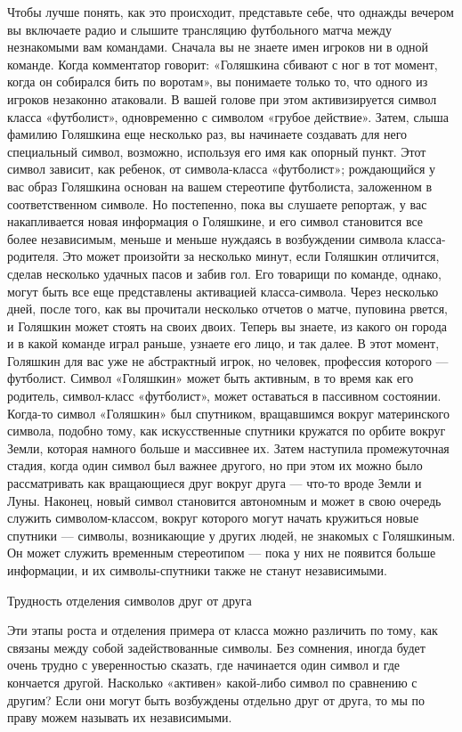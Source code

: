 \documentclass[../main.tex]{subfiles}
\begin{document}
Чтобы лучше понять, как это происходит, представьте себе, что однажды вечером вы включаете радио и слышите трансляцию футбольного матча между незнакомыми вам командами. Сначала вы не знаете имен игроков ни в одной команде. Когда комментатор говорит: «Голяшкина сбивают с ног в тот момент, когда он собирался бить по воротам», вы понимаете только то, что одного из игроков незаконно атаковали. В вашей голове при этом активизируется символ класса «футболист», одновременно с символом «грубое действие». Затем, слыша фамилию Голяшкина еще несколько раз, вы начинаете создавать для него специальный символ, возможно, используя его имя как опорный пункт. Этот символ зависит, как ребенок, от символа-класса «футболист»; рождающийся у вас образ Голяшкина основан на вашем стереотипе футболиста, заложенном в соответственном символе. Но постепенно, пока вы слушаете репортаж, у вас накапливается новая информация о Голяшкине, и его символ становится все более независимым, меньше и меньше нуждаясь в возбуждении символа класса-родителя. Это может произойти за несколько минут, если Голяшкин отличится, сделав несколько удачных пасов и забив гол. Его товарищи по команде, однако, могут быть все еще представлены активацией класса-символа. Через несколько дней, после того, как вы прочитали несколько отчетов о матче, пуповина рвется, и Голяшкин может стоять на своих двоих. Теперь вы знаете, из какого он города и в какой команде играл раньше, узнаете его лицо, и так далее. В этот момент, Голяшкин для вас уже не абстрактный игрок, но человек, профессия которого --- футболист. Символ «Голяшкин» может быть активным, в то время как его родитель, символ-класс «футболист», может оставаться в пассивном состоянии. Когда-то символ «Голяшкин» был спутником, вращавшимся вокруг материнского символа, подобно тому, как искусственные спутники кружатся по орбите вокруг Земли, которая намного больше и массивнее их. Затем наступила промежуточная стадия, когда один символ был важнее другого, но при этом их можно было рассматривать как вращающиеся друг вокруг друга --- что-то вроде Земли и Луны. Наконец, новый символ становится автономным и может в свою очередь служить символом-классом, вокруг которого могут начать кружиться новые спутники --- символы, возникающие у других людей, не знакомых с Голяшкиным. Он может служить временным стереотипом --- пока у них не появится больше информации, и их символы-спутники также не станут независимыми.

Трудность отделения символов друг от друга

Эти этапы роста и отделения примера от класса можно различить по тому, как связаны между собой задействованные символы. Без сомнения, иногда будет очень трудно с уверенностью сказать, где начинается один символ и где кончается другой. Насколько «активен» какой-либо символ по сравнению с другим? Если они могут быть возбуждены отдельно друг от друга, то мы по праву можем называть их независимыми.
\end{document}
